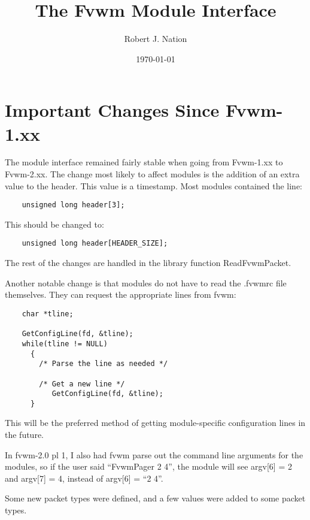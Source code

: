 \setlength{\textwidth}{6in}
\setlength{\oddsidemargin}{.25in}
\setlength{\topmargin}{0in}
\setlength{\textheight}{8in}
\setcounter{secnumdepth}{2}


\title {The Fvwm Module Interface}
\date{\today}
\author	{Robert J. Nation}
\maketitle

\section{Important Changes Since Fvwm-1.xx}
The module interface remained fairly stable when going from Fvwm-1.xx
to Fvwm-2.xx. The change most likely to affect modules is the addition
of an extra value to the header. This value is a timestamp. Most
modules contained the line:
\begin{verbatim}
	unsigned long header[3];
\end{verbatim}
This should be changed to:
\begin{verbatim}
	unsigned long header[HEADER_SIZE];
\end{verbatim}
The rest of the changes are handled in the library function
ReadFvwmPacket.

Another notable change is that modules do not have to read the .fvwmrc
file themselves. They can request the appropriate lines from fvwm:
\begin{verbatim}
	char *tline;

	GetConfigLine(fd, &tline);
	while(tline != NULL)
	  {
	    /* Parse the line as needed */

	    /* Get a new line */
           GetConfigLine(fd, &tline);	
	  }
\end{verbatim}
This will be the preferred method of getting module-specific
configuration lines in the future.

In fvwm-2.0 pl 1, I also had fvwm parse out the command line arguments
for the modules, so if the user said ``FvwmPager 2 4'', the module
will see argv[6] = 2 and argv[7] = 4, instead of argv[6] = ``2 4''.

Some new packet types were defined, and a few values were added to
some packet types.

